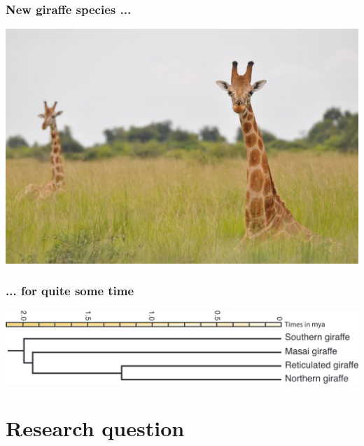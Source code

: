 \documentclass{beamer}
\begin{document}
\begin{frame}
  \frametitle{New giraffe species ... \footnotemark\footnotemark}
  \includegraphics[height=0.8\textheight]{fennessy_2016_nubian_giraffe.jpg}
\end{frame}

\begin{frame}
  \frametitle{... for quite some time\footnotemark}
  \includegraphics[width=\textwidth]{fennessy_2016_tree.png}
\end{frame}

\section[Research question]{Research question}
\end{document}
